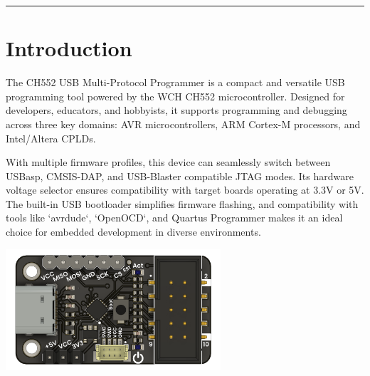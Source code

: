 \documentclass[10pt]{article}
\title{}
\author{}
\date{}
\begin{document}
\noindent
{}
\vspace{1em}
\hrule
\vspace{1.5em}

\section*{Introduction}
\vspace{0.5em}
\noindent
\begin{minipage}[t]{0.62\textwidth}
\setlength{\parskip}{0.75em}
\justifying
The CH552 USB Multi-Protocol Programmer is a compact and versatile USB programming tool powered by the WCH CH552 microcontroller. Designed for developers, educators, and hobbyists, it supports programming and debugging across three key domains: AVR microcontrollers, ARM Cortex-M processors, and Intel/Altera CPLDs.

\par

With multiple firmware profiles, this device can seamlessly switch between USBasp, CMSIS-DAP, and USB-Blaster compatible JTAG modes. Its hardware voltage selector ensures compatibility with target boards operating at 3.3V or 5V. The built-in USB bootloader simplifies firmware flashing, and compatibility with tools like `avrdude`, `OpenOCD`, and Quartus Programmer makes it an ideal choice for embedded development in diverse environments.
\end{minipage}
\hfill
\begin{minipage}[t]{0.35\textwidth}
\centering
\vspace{-0.5em}
\includegraphics[height=4.5cm,keepaspectratio]{./images/product.png}
\end{minipage}
\end{document}
